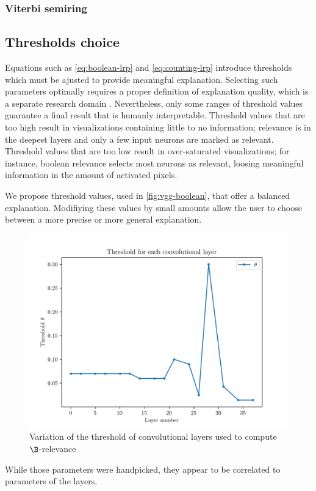 \documentclass{../cs-classes/cs-classes}
\newcommand*{\1}{\digitsbb{1}}
\newcommand*{\0}{\digitsbb{0}}
\begin{document}
\subsubsection{Viterbi semiring}

\subsection{Thresholds choice}
\label{seq:thresholds-choice}
Equations such as \ref{eq:boolean-lrp} and \ref{eq:counting-lrp} introduce thresholds which must be ajusted to provide meaningful explanation. Selecting such parameters optimally requires a proper definition of explanation quality, which is a separate research domain \cite{samek2016evaluating}. Nevertheless, only some ranges of threshold values guarantee a final result that is humanly interpretable. Threshold values that are too high result in visualizations containing little to no information; relevance is  in the deepest layers and only a few input neurons are marked as relevant. Threshold values that are too low result in over-saturated visualizations; for instance, boolean relevance selects most neurons as relevant, loosing meaningful information in the amount of activated pixels.

We propose threshold values, used in \autoref{fig:vgg-boolean}, that offer a balanced explanation. Modifiying these values by small amounts allow the user to choose between a more precise or more general explanation.
\begin{figure}[H]
    \centering
    \includegraphics[width=.6\textwidth]{threshold-graph.png}
    \caption{Variation of the threshold of convolutional layers used to compute $\B$-relevance}
\end{figure}

While those parameters were handpicked, they appear to be correlated to parameters of the layers.

\end{document}
